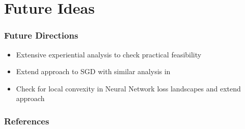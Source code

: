 \documentclass[pdf]{beamer}
\begin{document}
\section{Future Ideas}
\begin{frame}
    \frametitle{Future Directions}
    \begin{itemize}
        \item Extensive experiential analysis to check practical feasibility
        \item Extend approach to SGD with similar analysis in \cite{wuDeltaGradRapidRetraining2020}
        \item Check for local convexity in Neural Network loss landscapes and extend approach
    \end{itemize}
\end{frame}


\begin{frame}[allowframebreaks]
    \frametitle{References}
    
    
\end{frame}
  
\end{document}
